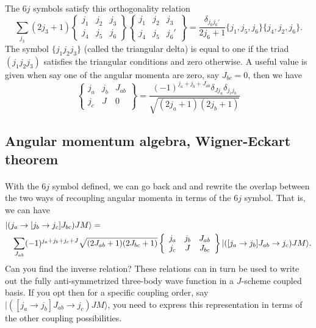 \documentclass[%
twoside,                 %
final,                   %
10pt]{article}
\begin{document}
\paragraph{}
The $6j$ symbols satisfy this orthogonality relation
\[
    \sum_{j_3} (2j_3+1) \begin{Bmatrix} j_1 & j_2 & j_3\\ j_4 & j_5 & j_6 \end{Bmatrix} \begin{Bmatrix} j_1 & j_2 & j_3\\ j_4 & j_5 & j_6' \end{Bmatrix} = \frac{\delta_{j_6^{}j_6'}}{2j_6+1} \{j_1,j_5,j_6\} \{j_4,j_2,j_6\}. 
\]
The symbol $\{j_1j_2j_3\}$ (called the triangular delta) is equal to one if the triad $(j_1j_2j_3)$ satisfies the triangular conditions and zero otherwise.
A useful value is given when say one of the angular momenta are zero, say $J_{bc}=0$, then we have
\[
\left\{\begin{array}{ccc} j_a & j_b& J_{ab} \\ j_c & J & 0 \end{array}\right\}=\frac{(-1)^{j_a+j_b+J_{ab}}\delta_{Jj_a}\delta_{j_cj_b} }{\sqrt{(2j_{a}+1)(2j_{b}+1)}}
\]



\subsection*{Angular momentum algebra, Wigner-Eckart theorem}

\paragraph{}
With the $6j$ symbol defined, we can go back and and rewrite the overlap between the two ways of recoupling angular momenta in terms of the $6j$ symbol.
That is, we can have  
\begin{eqnarray}
\nonumber
\lefteqn{| (j_a\rightarrow [j_b\rightarrow j_c]J_{bc}) JM\rangle = } \\
\nonumber
& &\sum_{J_{ab}}(-1)^{j_a+j_b+j_c+J}\sqrt{(2J_{ab}+1)(2J_{bc}+1)}\left\{\begin{array}{ccc} j_a & j_b& J_{ab} \\ j_c & J & J_{bc} \end{array}\right\}| ([j_a\rightarrow j_b]J_{ab}\rightarrow j_c) JM\rangle
. \nonumber
\end{eqnarray}
Can you find the inverse relation?  
These relations can in turn be used to write out the fully anti-symmetrized three-body wave function in a $J$-scheme coupled basis. 
If you opt then for a specific coupling order, say $| ([j_a\rightarrow j_b]J_{ab}\rightarrow j_c) JM\rangle$, you need to express this representation in terms of the other coupling possibilities.
\end{document}
